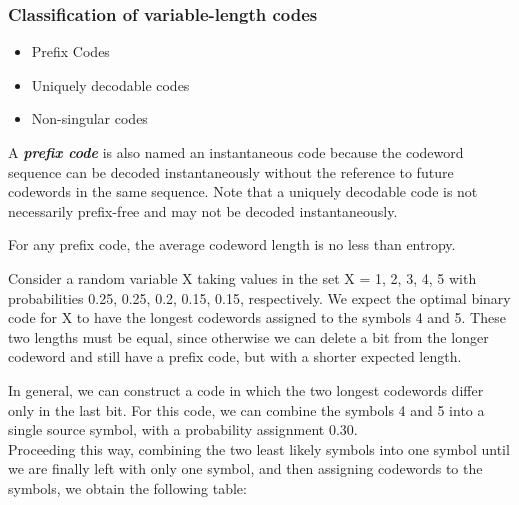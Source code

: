 \documentclass[a4]{beamer}
\begin{document}
\begin{frame}
\frametitle{Classification of variable-length codes}

\begin{itemize}
	\item Prefix Codes
	\item Uniquely decodable codes
	\item Non-singular codes
\end{itemize}

A \textbf{\emph{prefix code}} is also named an instantaneous code because the codeword sequence can be decoded instantaneously without the reference to future codewords
in the same sequence. Note that a uniquely decodable code is not necessarily
prefix-free and may not be decoded instantaneously.

For any prefix code, the average codeword length is no less than entropy.
\end{frame}


\begin{frame}
Consider a random variable X taking values in the set
X = {1, 2, 3, 4, 5} with probabilities 0.25, 0.25, 0.2, 0.15, 0.15, respectively.
We expect the optimal binary code for X to have the longest
codewords assigned to the symbols 4 and 5. These two lengths must be
equal, since otherwise we can delete a bit from the longer codeword and
still have a prefix code, but with a shorter expected length.


\end{frame}



\begin{frame} In general,
we can construct a code in which the two longest codewords differ only
in the last bit. For this code, we can combine the symbols 4 and 5 into
a single source symbol, with a probability assignment 0.30. \\ Proceeding
this way, combining the two least likely symbols into one symbol until
we are finally left with only one symbol, and then assigning codewords
to the symbols, we obtain the following table:


\end{frame}
\end{document}
